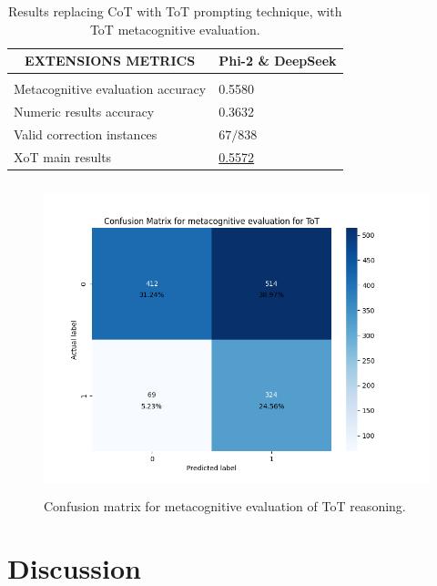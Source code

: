 \documentclass[10pt]{article} %
\begin{document}
\begin{table}[t]
  \caption{Results replacing CoT with ToT prompting technique, with ToT metacognitive evaluation.}
  \label{extension2-results-with-meta}
  \begin{center}
  \begin{tabular}{ll}
  \multicolumn{1}{c}{\bf EXTENSIONS METRICS}  &\multicolumn{1}{c}{\bf Phi-2 \& DeepSeek}
  \\ \hline \\
  Metacognitive evaluation accuracy        &0.5580\\
  Numeric results accuracy                 &0.3632\\
  Valid correction instances               &$67/838$\\
  XoT main results                         &\underline{0.5572}\\
  \end{tabular}
  \end{center}
  \end{table}

  \begin{figure}[h]
    \begin{center}
      \includegraphics[height=9cm]{graphs/cm_metacognitive_tot.png}
      \end{center}
      \caption{Confusion matrix for metacognitive evaluation of ToT reasoning.}
      \label{fig:cm-metacognitive-tot}
    \end{figure}



\section{Discussion}
\end{document}
